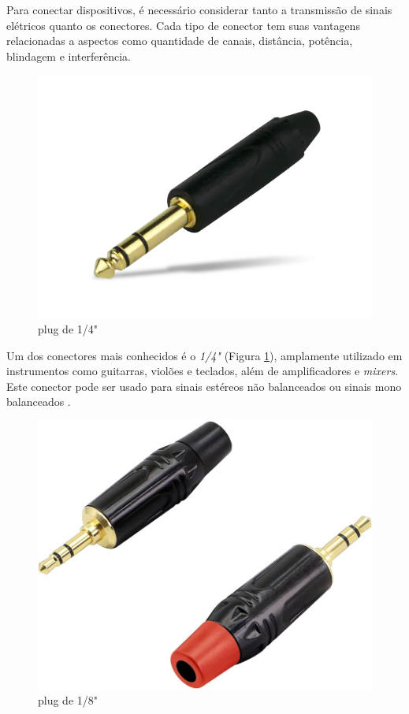 Para conectar dispositivos, é necessário considerar tanto a transmissão de sinais elétricos quanto os conectores. Cada tipo de conector tem suas vantagens relacionadas a aspectos como quantidade de canais, distância, potência, blindagem e interferência.

\begin{figure}[h]
	\centering
    \includegraphics[scale=0.2]{figuras/fig19.png}
	\caption{plug de 1/4" \cite{mouser}}
	\label{fig19}
\end{figure}

Um dos conectores mais conhecidos é o \textit{1/4"} (Figura \ref{fig19}), amplamente utilizado em instrumentos como guitarras, violões e teclados, além de amplificadores e \textit{mixers}. Este conector pode ser usado para sinais estéreos não balanceados ou sinais mono balanceados \cite{bartlett}.

\begin{figure}[h]
	\centering
    \includegraphics[scale=0.2]{figuras/fig20.png}
	\caption{plug de 1/8" \cite{mouser}}
	\label{fig20}
\end{figure}

